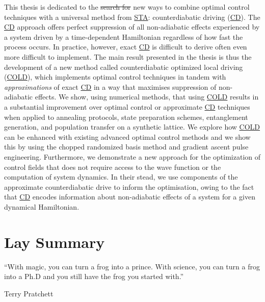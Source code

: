 \documentclass[a4paper,oneside,11pt]{book}
\newcommand{\acrref}[1]{\hyperref[acr:#1]{#1}}
\providecommand{\DIFaddtex}[1]{{\protect\color{blue}\uwave{#1}}} %
\providecommand{\DIFdeltex}[1]{{\protect\color{red}\sout{#1}}}                      %
\providecommand{\DIFaddbegin}{} %
\providecommand{\DIFaddend}{} %
\providecommand{\DIFdelbegin}{} %
\providecommand{\DIFdelend}{} %
\providecommand{\DIFadd}[1]{\texorpdfstring{\DIFaddtex{#1}}{#1}} %
\providecommand{\DIFdel}[1]{\texorpdfstring{\DIFdeltex{#1}}{}} %
\newcommand{\DIFscaledelfig}{0.5}
\newlength{\DIFdelgraphicswidth} %
\newlength{\DIFdelgraphicsheight} %
\newcommand{\DIFaddincludegraphics}[2][]{{\color{blue}\fbox{\DIFOincludegraphics[#1]{#2}}}} %
\newcommand{\DIFdelincludegraphics}[2][]{%
\sbox{\DIFdelgraphicsbox}{\DIFOincludegraphics[#1]{#2}}%
\settoboxwidth{\DIFdelgraphicswidth}{\DIFdelgraphicsbox} %
\settoboxtotalheight{\DIFdelgraphicsheight}{\DIFdelgraphicsbox} %
\scalebox{\DIFscaledelfig}{%
\parbox[b]{\DIFdelgraphicswidth}{\usebox{\DIFdelgraphicsbox}\\[-\baselineskip] \rule{\DIFdelgraphicswidth}{0em}}\llap{\resizebox{\DIFdelgraphicswidth}{\DIFdelgraphicsheight}{%
\setlength{\unitlength}{\DIFdelgraphicswidth}%
\begin{picture}(1,1)%
\thicklines\linethickness{2pt} %
{\color[rgb]{1,0,0}\put(0,0){\framebox(1,1){}}}%
{\color[rgb]{1,0,0}\put(0,0){\line( 1,1){1}}}%
{\color[rgb]{1,0,0}\put(0,1){\line(1,-1){1}}}%
\end{picture}%
}\hspace*{3pt}}} %
} %
\DeclareRobustCommand{\DIFaddbegin}{\DIFOaddbegin \let\includegraphics\DIFaddincludegraphics} %
\DeclareRobustCommand{\DIFaddend}{\DIFOaddend \let\includegraphics\DIFOincludegraphics} %
\DeclareRobustCommand{\DIFdelbegin}{\DIFOdelbegin \let\includegraphics\DIFdelincludegraphics} %
\DeclareRobustCommand{\DIFdelend}{\DIFOaddend \let\includegraphics\DIFOincludegraphics} %
\begin{document}
This thesis is dedicated to the \DIFdelbegin \DIFdel{search for }\DIFdelend \DIFaddbegin \DIFadd{discovery of }\DIFaddend new ways to combine optimal control techniques with a universal method from \acrref{STA}: counterdiabatic driving (\acrref{CD}). The \acrref{CD} approach offers perfect suppression of all non-adiabatic effects experienced by a system driven by a time-dependent Hamiltonian regardless of how fast the process occurs. In practice, however, exact \acrref{CD} is difficult to derive often even more difficult to implement. The main result presented in the thesis is thus the development of a new method called counterdiabatic optimized local driving (\acrref{COLD}), which implements optimal control techniques in tandem with \emph{approximations} of exact \acrref{CD} in a way that maximises suppression of non-adiabatic effects. We show, using numerical methods, that using \acrref{COLD} results in a substantial improvement over optimal control or approximate \acrref{CD} techniques when applied to annealing protocols, state preparation schemes, entanglement generation, and population transfer on a synthetic lattice. We explore how \acrref{COLD} can be enhanced with existing advanced optimal control methods and we show this by using the chopped randomized basis method and gradient ascent pulse engineering. Furthermore, we demonstrate a new approach for the optimization of control fields that does not require access to the wave function or the computation of system dynamics. In their stead, we use components of the approximate counterdiabatic drive to inform the optimisation, owing to the fact that \acrref{CD} encodes information about non-adiabatic effects of a system for a given dynamical Hamiltonian. 

\tableofcontents

\chapter{Lay Summary}
\epigraph{“With magic, you can turn a frog into a prince. With science, you can turn a frog into a Ph.D and you still have the frog you started with.”}{Terry Pratchett}
\end{document}
